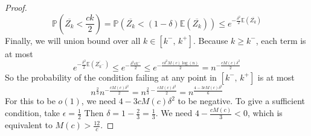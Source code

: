 \documentclass{amsart}
\theoremstyle{plain}
\theoremstyle{definition}
\begin{document}
\begin{proof}
\begin{equation}
        \mathbb{P}\left(\overline{Z_k} < \frac{ck}{2}\right) =
        \mathbb{P}\left(\overline{Z_k} < (1 - \delta)\mathbb{E}(\overline{Z_k})\right) \leq
        e^{-\frac{\delta^2}{2}\mathbb{E}(\overline{Z_k})}
        \label{eq:chernoff}
    \end{equation}
    \noindent Finally, we will union bound over all $k \in [k^{-}, \, k^{+}]$.
    Because $k \geq k^-$, each term is at most
    \begin{equation}
        e^{-\frac{\delta^2}{2}\mathbb{E}(\overline{Z_{k^-}})} \leq
        e^{-\frac{\delta^2ck^-}{2}} \leq
        e^{-\frac{c\delta^2M(c)\log(n)}{2}} =
        n^{-\frac{cM(c)\delta^2}{2}}
        \label{eq:logbound}
    \end{equation}
    So the probability of the condition failing at any point in $[k^{-}, \, k^{+}]$ is at most
    \begin{equation}
        n^{\frac{2}{3}}n^{-\frac{cM(c)\delta^2}{2}} = n^{\frac{2}{3} - \frac{cM(c)\delta^2}{2}} =
        n^{\frac{4- 3cM(c)\delta^2}{6}}
        \label{eq:finalbound}
    \end{equation}
    \noindent For this to be $o(1)$, we need $4 - 3cM(c)\delta^2$ to be negative.
    To give a sufficient condition, take $\epsilon = \frac{1}{2}$ Then $\delta =  1 - \frac{2}{3} = \frac{1}{3}$.
    We need $4 - \frac{cM(c)}{3} < 0$, which is equivalent to $M(c) > \frac{12}{c}$.
    \end{proof}
\end{document}
